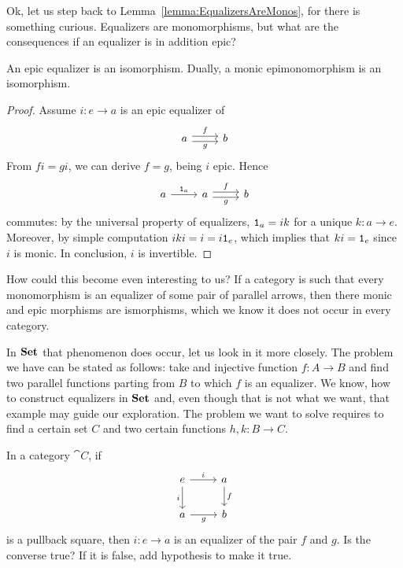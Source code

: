 Ok, let us step back to Lemma~\ref{lemma:EqualizersAreMonos}, for
there is something curious. Equalizers are monomorphisms, but what are
the consequences if an equalizer is in addition epic?

\begin{proposition}\label{proposition:EpicEqualizersAreIsomorphisms}
  An epic equalizer is an isomorphism. Dually, a monic epimonomorphism
  is an isomorphism.
\end{proposition}

\begin{proof}
  Assume \(i : e \to a\) is an epic equalizer of
  \[\begin{tikzcd} a \ar["f", r, shift left] \ar["g", r, shift right,
      swap] & b \end{tikzcd}\] From \(fi = gi\), we can derive
  \(f = g\), being \(i\) epic. Hence
  \[\begin{tikzcd} a \ar["{\id_a}", r] & a \ar["f", r, shift left]
      \ar["g", r, shift right, swap] & b \end{tikzcd}\] commutes: by
  the universal property of equalizers, \(\mathtt 1_a = ik\) for a unique
  \(k : a \to e\). Moreover, by simple computation
  \(iki = i = i \mathtt 1_e\), which implies that \(ki = \mathtt 1_e\) since \(i\)
  is monic. In conclusion, \(i\) is invertible.
\end{proof}

How could this become even interesting to us? If a category is such
that every monomorphism is an equalizer of some pair of parallel
arrows, then there monic and epic morphisms are ismorphisms, which we
know it does not occur in every category.

\begin{example}
  In \(\mathbf{Set}\) that phenomenon does occur, let us look in it more
  closely. The problem we have can be stated as follows: take and
  injective function \(f : A \to B\) and find two parallel functions
  parting from \(B\) to which \(f\) is an equalizer. We know, how to
  construct equalizers in \(\mathbf{Set}\) and, even though that is not what
  we want, that example may guide our exploration. The problem we want
  to solve requires to find a certain set \(C\) and two certain
  functions \(h, k : B \to C\). \YetToBeTeXed{}
\end{example}

\begin{exercise}
  In a category \(\cat C\), if
  \[\begin{tikzcd}
      e \ar["i", r] \ar["i", d, swap] & a \ar["f", d] \\
      a \ar["g", r, swap] & b
    \end{tikzcd}\] is a pullback square, then \(i : e \to a\) is an
  equalizer of the pair \(f\) and \(g\). Is the converse true? If it
  is false, add hypothesis to make it true.
\end{exercise}

